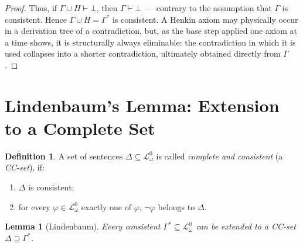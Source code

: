 \documentclass[12pt, a4paper]{article}
\theoremstyle{plain}
\newtheorem{lemma}[theorem]{Lemma}
\theoremstyle{definition}
\newtheorem{definition}[theorem]{Definition}
\newcommand{\proves}{\vdash}
\newcommand{\Lw}{\mathcal{L}_\omega}
\begin{document}
\begin{proof}
\smallskip
Thus, if $\Gamma \cup H \proves \bot$, then $\Gamma \proves \bot$~---
contrary to the assumption that $\Gamma$ is consistent. Hence
$\Gamma \cup H = \Gamma^*$ is consistent. A Henkin axiom
may physically occur in a derivation tree of a contradiction, but, as the
base step applied one axiom at a time shows, it is structurally
always eliminable: the contradiction in which it is used
collapses into a shorter contradiction, ultimately obtained
directly from $\Gamma$.
\end{proof}

\section{Lindenbaum's Lemma: Extension to a Complete Set}

\begin{definition}
A set of sentences $\Delta \subseteq \Lw^0$ is called
\emph{complete and consistent} (a \emph{CC-set}), if:
\begin{enumerate}[label=(\roman*)]
  \item $\Delta$ is consistent;
  \item for every $\varphi \in \Lw^0$ exactly one of $\varphi,\,\neg\varphi$
        belongs to $\Delta$.
\end{enumerate}
\end{definition}

\begin{lemma}[Lindenbaum]\label{lem:lindenbaum}
Every consistent $\Gamma^* \subseteq \Lw^0$ can be extended
to a CC-set $\Delta \supseteq \Gamma^*$.
\end{lemma}
\end{document}
